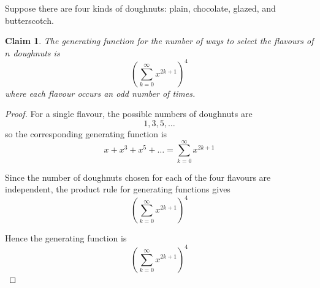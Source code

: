 \documentclass{article}
\newtheorem{claim}{Claim}
\begin{document}
Suppose there are four kinds of doughnuts: plain, chocolate, glazed, and butterscotch. 

\begin{claim}
    The generating function for the number of ways to select the flavours of $n$ doughnuts is
    \[
    \left(\sum_{k=0}^{\infty}x^{2k+1}\right)^4
    \]
    where each flavour occurs an odd number of times.
\end{claim}

\begin{proof}
    For a single flavour, the possible numbers of doughnuts are
    \[
    1, 3, 5, \dots
    \]
    so the corresponding generating function is
    \[
    x + x^3 + x^5 + \dots = \sum_{k=0}^{\infty}x^{2k+1}
    \]

    \medskip

    Since the number of doughnuts chosen for each of the four flavours are independent, the 
    product rule for generating functions gives
    \[
    \left(\sum_{k=0}^{\infty}x^{2k+1}\right)^4
    \]

    \medskip

    Hence the generating function is
    \[
    \left(\sum_{k=0}^{\infty}x^{2k+1}\right)^4
    \]
\end{proof}
\end{document}
